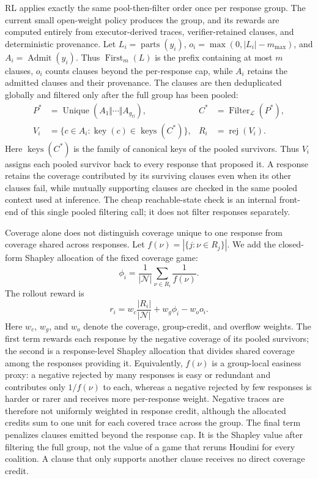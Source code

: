 RL applies exactly the same pool-then-filter order once per response group.
The current small open-weight policy produces the group, and its rewards are
computed entirely from executor-derived traces, verifier-retained clauses,
and deterministic provenance.
Let \(L_i=\operatorname{parts}(y_i)\),
\(o_i=\max(0,|L_i|-m_{\max})\), and
\(A_i=\operatorname{Admit}(y_i)\).  Thus
\(\operatorname{First}_{m}(L)\) is the prefix containing at most \(m\) clauses,
\(o_i\) counts clauses beyond the per-response cap, while \(A_i\) retains the
admitted clauses and their provenance.  The clauses are then deduplicated
globally and filtered only after the full group has been pooled:
\begin{align}
  P^*&=\operatorname{Unique}\!\left(A_1\Vert\cdots\Vert A_{g_{\mathrm{rl}}}\right),
  &C^*&=\operatorname{Filter}_{\mathcal L}(P^*),\\
  V_i&=\{c\in A_i:\operatorname{key}(c)\in\operatorname{keys}(C^*)\},
  &R_i&=\operatorname{rej}(V_i).
  \label{eq:method-credit-pool}
\end{align}
Here \(\operatorname{keys}(C^*)\) is the family of canonical keys of the
pooled survivors.  Thus \(V_i\) assigns each pooled survivor back to every response that proposed
it.  A response retains the coverage contributed by its surviving clauses
even when its other clauses fail, while mutually supporting clauses are
checked in the same pooled context
used at inference.  The cheap reachable-state check is an internal front-end
of this single pooled filtering call; it does not filter responses separately.

Coverage alone does not distinguish coverage unique to one response from
coverage shared across responses.  Let
\(f(\nu)=|\{j:\nu\in R_j\}|\).  We add the closed-form Shapley allocation of
the fixed coverage game:
\begin{equation}
\label{eq:shapley-credit}
  \phi_i=\frac{1}{|\mathcal N|}
  \sum_{\nu\in R_i}\frac{1}{f(\nu)}.
\end{equation}
The rollout reward is
\begin{equation}
\label{eq:generation-reward}
  r_i=w_c\frac{|R_i|}{|\mathcal N|}+w_g\phi_i-w_o o_i.
\end{equation}
Here \(w_c\), \(w_g\), and \(w_o\) denote the coverage, group-credit, and
overflow weights.  The first term rewards each response by the negative
coverage of its pooled survivors; the
second is a response-level Shapley allocation that divides shared coverage
among the responses providing it.  Equivalently, \(f(\nu)\) is a group-local
easiness proxy: a negative rejected by many responses is easy or redundant
and contributes only \(1/f(\nu)\) to each, whereas a negative rejected by few
responses is harder or rarer and receives more per-response weight.  Negative
traces are therefore not uniformly weighted in response credit, although the
allocated credits sum to one unit for each covered trace across the group.
The final term penalizes clauses emitted beyond the response cap.
It is the Shapley value after filtering the full group, not the value of a game
that reruns Houdini for every coalition.  A clause that only supports another
clause receives no direct coverage credit.

